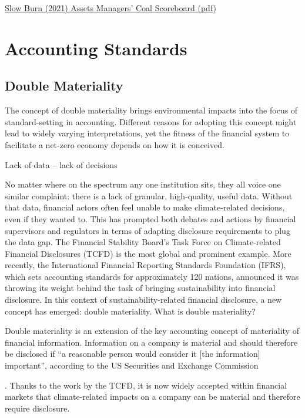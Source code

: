 \documentclass[
]{book}
\begin{document}
\href{pdf/SlowBurn_2021_Coal_Scoreboard.pdf}{Slow Burn (2021) Assets Managers' Coal Scoreboard (pdf)}

\hypertarget{accounting-standards}{%
\section{Accounting Standards}\label{accounting-standards}}

\hypertarget{double-materiality}{%
\subsection{Double Materiality}\label{double-materiality}}

The concept of double materiality brings environmental impacts into the focus of standard-setting in accounting. Different reasons for adopting this concept might lead to widely varying interpretations, yet the fitness of the financial system to facilitate a net-zero economy depends on how it is conceived.

Lack of data -- lack of decisions

No matter where on the spectrum any one institution sits, they all voice one similar complaint: there is a lack of granular, high-quality, useful data. Without that data, financial actors often feel unable to make climate-related decisions, even if they wanted to. This has prompted both debates and actions by financial supervisors and regulators in terms of adapting disclosure requirements to plug the data gap. The Financial Stability Board's Task Force on Climate-related Financial Disclosures (TCFD) is the most global and prominent example. More recently, the International Financial Reporting Standards Foundation (IFRS), which sets accounting standards for approximately 120 nations, announced it was throwing its weight behind the task of bringing sustainability into financial disclosure. In this context of sustainability-related financial disclosure, a new concept has emerged: double materiality.
What is double materiality?

Double materiality is an extension of the key accounting concept of materiality of financial information. Information on a company is material and should therefore be disclosed if ``a reasonable person would consider it {[}the information{]} important'', according to the US Securities and Exchange Commission﻿

. Thanks to the work by the TCFD, it is now widely accepted within financial markets that climate-related impacts on a company can be material and therefore require disclosure.
\end{document}
